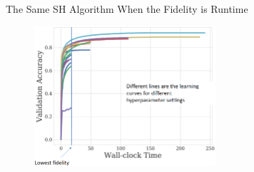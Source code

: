 
\begin{frame}{The Same SH Algorithm When the Fidelity is Runtime}
\vskip -10pt
\hskip 270pt
    
\begin{figure}
    \centering
    \includegraphics[width=0.6\textwidth]{../w07_hpo_speedup/images/hyperband/sh_accuracy_over_time.png}
\end{figure}
    
\end{frame}


%
%    
%    
%    
%    
%

